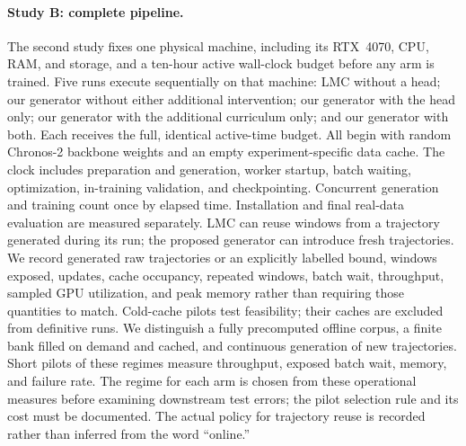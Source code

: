 \paragraph{Study B: complete pipeline.}
The second study fixes one physical machine, including its RTX~4070, CPU,
RAM, and storage, and a ten-hour active wall-clock budget before any arm is
trained. Five runs execute sequentially on that machine: LMC without a head;
our generator without either additional intervention; our generator with the
head only; our generator with the additional curriculum only; and our
generator with both. Each receives the full, identical active-time budget.
All begin with random Chronos-2 backbone weights
and an empty experiment-specific data cache. The clock includes preparation
and generation, worker startup, batch waiting, optimization, in-training
validation, and checkpointing. Concurrent generation and training count once
by elapsed time. Installation and final real-data evaluation are measured
separately. LMC can reuse windows from a trajectory generated during its
run; the proposed generator can introduce fresh trajectories. We record
generated raw trajectories or an explicitly labelled bound, windows exposed,
updates, cache occupancy, repeated windows, batch wait, throughput, sampled
GPU utilization, and peak memory rather than requiring those quantities to
match. Cold-cache
pilots test feasibility; their caches are excluded from definitive runs.
We distinguish a fully precomputed offline corpus, a finite bank filled
on demand and cached, and continuous generation of new trajectories.
Short pilots of these regimes measure throughput, exposed batch wait,
memory, and failure rate. The regime for each arm is chosen from these
operational measures before examining downstream test errors; the pilot
selection rule and its cost must be documented. The actual policy for
trajectory reuse is recorded rather than inferred from the word ``online.''

